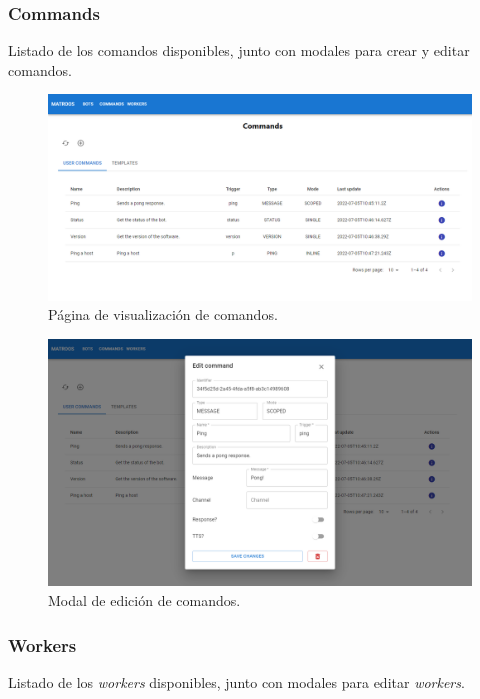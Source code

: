 \subsubsection{Commands}

Listado de los comandos disponibles, junto con modales para crear y editar comandos.

\begin{figure}[H]
	\centering
	\includegraphics[width=1\textwidth]{img/front/page-commands.png}
	\caption{Página de visualización de comandos.}
\end{figure}

\begin{figure}[H]
	\centering
	\includegraphics[width=1\textwidth]{img/front/page-commands-edit.png}
	\caption{Modal de edición de comandos.}
\end{figure}

\subsubsection{Workers}

Listado de los \textit{workers} disponibles, junto con modales para editar \textit{workers}.

